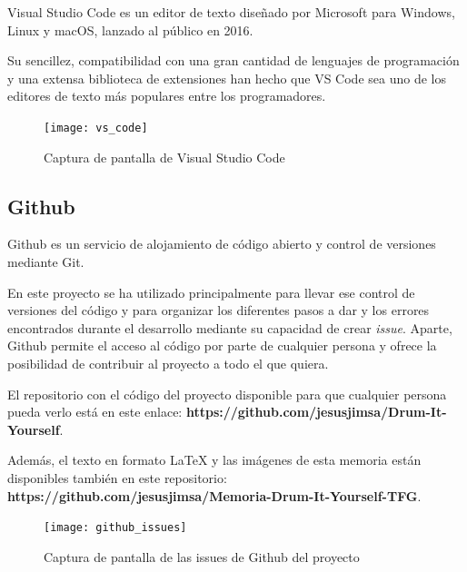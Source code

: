             Visual Studio Code es un editor de texto diseñado por Microsoft para Windows, Linux y macOS, lanzado al
            público en 2016.

            Su sencillez, compatibilidad con una gran cantidad de lenguajes de programación y una extensa biblioteca de
            extensiones han hecho que VS Code sea uno de los editores de texto más populares entre los programadores.
            \cite{wikipedia_vs_code}

            \begin{figure}[ht]
                \centering
                \texttt{[image: vs\_code]}
                \caption{Captura de pantalla de Visual Studio Code \label{fig:VisualStudioCode}}
            \end{figure}

            \newpage


        \subsection{Github} %
        \label{sub:Github}

            Github es un servicio de alojamiento de código abierto y control de versiones mediante Git.

            En este proyecto se ha utilizado principalmente para llevar ese control de versiones del código y para
            organizar los diferentes pasos a dar y los errores encontrados durante el desarrollo mediante su capacidad
            de crear \textit{issue}. Aparte, Github permite el acceso al código por parte de cualquier persona y ofrece
            la posibilidad de contribuir al proyecto a todo el que quiera.

            El repositorio con el código del proyecto disponible para que cualquier persona pueda verlo está en este
            enlace: \textbf{https://github.com/jesusjimsa/Drum-It-Yourself}.

            Además, el texto en formato LaTeX y las imágenes de esta memoria están disponibles también en este
            repositorio: \textbf{https://github.com/jesusjimsa/Memoria-Drum-It-Yourself-TFG}.

            \begin{figure}[ht]
                \centering
                \texttt{[image: github\_issues]}
                \caption{Captura de pantalla de las issues de Github del proyecto \label{fig:GithubIssues}}
            \end{figure}

